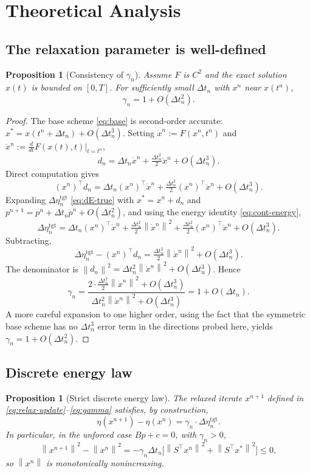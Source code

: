 \documentclass[11pt]{article}
\newtheorem{proposition}[theorem]{Proposition}
\theoremstyle{definition}
\newcommand{\norm}[1]{\left\|#1\right\|}
\newcommand{\dt}{\Delta t}
\begin{document}
\section{Theoretical Analysis}

\subsection{The relaxation parameter is well-defined}

\begin{proposition}[Consistency of $\gamma_n$]
\label{prop:gamma-consistency}
Assume $F$ is $C^2$ and the exact solution $x(t)$ is bounded on $[0, T]$. For sufficiently small $\dt_n$ with $x^n$ near $x(t^n)$,
\[
\gamma_n = 1 + O(\dt_n^2).
\]
\end{proposition}

\begin{proof}
The base scheme \eqref{eq:base} is second-order accurate: $x^* = x(t^n + \dt_n) + O(\dt_n^3)$. Setting $\dot x^n := F(x^n, t^n)$ and $\ddot x^n := \frac{d}{dt} F(x(t), t)\big|_{t=t^n}$,
\[
d_n = \dt_n \dot x^n + \tfrac{\dt_n^2}{2} \ddot x^n + O(\dt_n^3).
\]
Direct computation gives
\[
(x^n)^\top d_n = \dt_n (x^n)^\top \dot x^n + \tfrac{\dt_n^2}{2}(x^n)^\top \ddot x^n + O(\dt_n^3).
\]
Expanding $\Delta\eta^{\text{tgt}}_n$ \eqref{eq:dE-true} with $x^* = x^n + d_n$ and $p^{n+1} = p^n + \dt_n \dot p^n + O(\dt_n^2)$, and using the energy identity \eqref{eq:cont-energy},
\[
\Delta\eta^{\text{tgt}}_n
= \dt_n (x^n)^\top \dot x^n
+ \tfrac{\dt_n^2}{2}\norm{\dot x^n}^2
+ \tfrac{\dt_n^2}{2}(x^n)^\top \ddot x^n
+ O(\dt_n^3).
\]
Subtracting,
\[
\Delta\eta^{\text{tgt}}_n - (x^n)^\top d_n = \tfrac{\dt_n^2}{2}\norm{\dot x^n}^2 + O(\dt_n^3).
\]
The denominator is $\norm{d_n}^2 = \dt_n^2 \norm{\dot x^n}^2 + O(\dt_n^3)$. Hence
\[
\gamma_n = \frac{2 \cdot \tfrac{\dt_n^2}{2}\norm{\dot x^n}^2 + O(\dt_n^3)}{\dt_n^2 \norm{\dot x^n}^2 + O(\dt_n^3)} = 1 + O(\dt_n).
\]
A more careful expansion to one higher order, using the fact that the symmetric base scheme has no $\dt_n^3$ error term in the directions probed here, yields $\gamma_n = 1 + O(\dt_n^2)$.
\end{proof}

\subsection{Discrete energy law}

\begin{proposition}[Strict discrete energy law]
\label{prop:energy-law}
The relaxed iterate $x^{n+1}$ defined in \eqref{eq:relax-update}--\eqref{eq:gamma} satisfies, by construction,
\[
\eta(x^{n+1}) - \eta(x^n) = \gamma_n \cdot \Delta\eta^{\text{tgt}}_n.
\]
In particular, in the unforced case $Bp + c = 0$, with $\gamma_n > 0$,
\[
\norm{x^{n+1}}^2 - \norm{x^n}^2 = -\gamma_n \dt_n \bigl[\norm{S^\top x^n}^2 + \norm{S^\top x^*}^2\bigr] \le 0,
\]
so $\norm{x^n}$ is monotonically nonincreasing.
\end{proposition}
\end{document}
